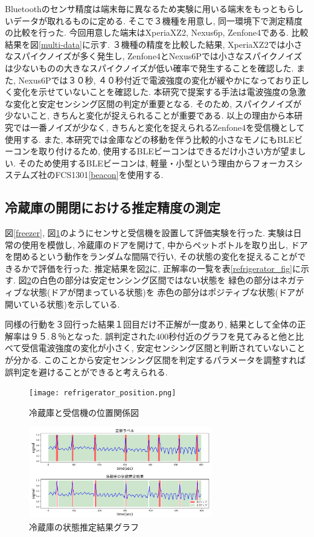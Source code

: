 \documentclass[Japanese]{dicomopapers}
\begin{document}
Bluetoothのセンサ精度は端末毎に異なるため実験に用いる端末をもっともらしいデータが取れるものに定める.
そこで３機種を用意し, 同一環境下で測定精度の比較を行った.
今回用意した端末はXperiaXZ2, Nexus6p, Zenfone4である.
比較結果を図\ref{multi-data}に示す.
３機種の精度を比較した結果, XperiaXZ2では小さなスパイクノイズが多く発生し, Zenfone4とNexus6Pでは小さなスパイクノイズは少ないものの大きなスパイクノイズが低い確率で発生することを確認した.
また, Nexus6Pでは３０秒, ４０秒付近で電波強度の変化が緩やかになっており正しく変化を示せていないことを確認した.
本研究で提案する手法は電波強度の急激な変化と安定センシング区間の判定が重要となる.
そのため, スパイクノイズが少ないこと, きちんと変化が捉えられることが重要である.
以上の理由から本研究では一番ノイズが少なく, きちんと変化を捉えられるZenfone4を受信機として使用する.
また, 本研究では金庫などの移動を伴う比較的小さなモノにもBLEビーコンを取り付けるため, 使用するBLEビーコンはできるだけ小さい方が望ましい.
そのため使用するBLEビーコンは, 軽量・小型という理由からフォーカスシステムズ社のFCS1301\ref{beacon}を使用する.


\subsection{冷蔵庫の開閉における推定精度の測定}
図\ref{freezer}, 図\ref{refrigerator_position}のようにセンサと受信機を設置して評価実験を行った.
実験は日常の使用を模倣し, 冷蔵庫のドアを開けて, 中からペットボトルを取り出し, ドアを閉めるという動作をランダムな間隔で行い, その状態の変化を捉えることができるかで評価を行った.
推定結果を図\ref{refrigerator_graph}に, 正解率の一覧を表\ref{refrigerator_fig}に示す.
図\ref{refrigerator_graph}の白色の部分は安定センシング区間ではない状態を 緑色の部分はネガティブな状態(ドアが閉まっている状態)を 赤色の部分はポジティブな状態(ドアが開いている状態)を示している.

同様の行動を３回行った結果１回目だけ不正解が一度あり, 結果として全体の正解率は９５.８％となった.
誤判定された400秒付近のグラフを見てみると他と比べて受信電波強度の変化が小さく, 安定センシング区間と判断されていないことが分かる.
このことから安定センシング区間を判定するパラメータを調整すれば誤判定を避けることができると考えられる.

\begin{figure}[ht]
    \centering
    \texttt{[image: refrigerator\_position.png]}
    \caption{冷蔵庫と受信機の位置関係図}
    \label{refrigerator_position}
\end{figure}

\begin{figure}[ht]
    \centering
    \includegraphics[width=8cm]{refrigerator_graph.png}
    \caption{冷蔵庫の状態推定結果グラフ}
    \label{refrigerator_graph}
\end{figure}
\end{document}
